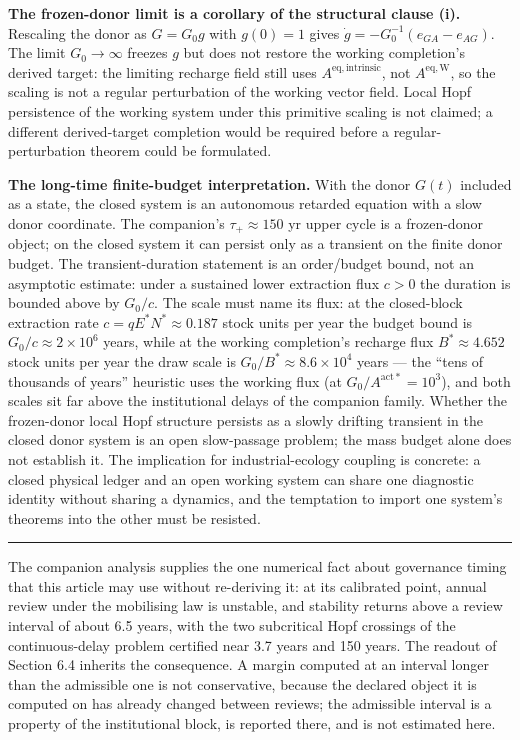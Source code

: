 \documentclass[11pt]{article}
\begin{document}
\textbf{The frozen-donor limit is a corollary of the structural clause
(i).} Rescaling the donor as \(G = G_0 g\) with \(g(0) = 1\) gives
\(\dot g = -G_0^{-1}(e_{GA} - e_{AG})\). The limit \(G_0 \to \infty\)
freezes \(g\) but does not restore the working completion's derived
target: the limiting recharge field still uses
\(A^{\mathrm{eq,intrinsic}}\), not \(A^{\mathrm{eq,W}}\), so the scaling
is not a regular perturbation of the working vector field. Local Hopf
persistence of the working system under this primitive scaling is not
claimed; a different derived-target completion would be required before
a regular-perturbation theorem could be formulated.

\textbf{The long-time finite-budget interpretation.} With the donor
\(G(t)\) included as a state, the closed system is an autonomous
retarded equation with a slow donor coordinate. The companion's
\(\tau_+ \approx 150\) yr upper cycle is a frozen-donor object; on the
closed system it can persist only as a transient on the finite donor
budget. The transient-duration statement is an order/budget bound, not
an asymptotic estimate: under a sustained lower extraction flux
\(c > 0\) the duration is bounded above by \(G_0/c\). The scale must
name its flux: at the closed-block extraction rate
\(c = qE^*N^* \approx 0.187\) stock units per year the budget bound is
\(G_0/c \approx 2 \times 10^6\) years, while at the working completion's
recharge flux \(B^* \approx 4.652\) stock units per year the draw scale
is \(G_0/B^* \approx 8.6 \times 10^4\) years --- the ``tens of thousands
of years'' heuristic uses the working flux (at
\(G_0/A^{\mathrm{act}*} = 10^3\)), and both scales sit far above the
institutional delays of the companion family. Whether the frozen-donor
local Hopf structure persists as a slowly drifting transient in the
closed donor system is an open slow-passage problem; the mass budget
alone does not establish it. The implication for industrial-ecology
coupling is concrete: a closed physical ledger and an open working
system can share one diagnostic identity without sharing a dynamics, and
the temptation to import one system's theorems into the other must be
resisted.

\begin{center}\rule{0.5\linewidth}{0.5pt}\end{center}

The companion analysis supplies the one numerical fact about governance timing that this article may
use without re-deriving it: at its calibrated point, annual review under the mobilising law is
unstable, and stability returns above a review interval of about 6.5 years, with the two subcritical
Hopf crossings of the continuous-delay problem certified near 3.7 years and 150 years. The readout of
Section 6.4 inherits the consequence. A margin computed at an interval longer than the admissible
one is not conservative, because the declared object it is computed on has already changed between
reviews; the admissible interval is a property of the institutional block, is reported there, and is
not estimated here.
\end{document}
